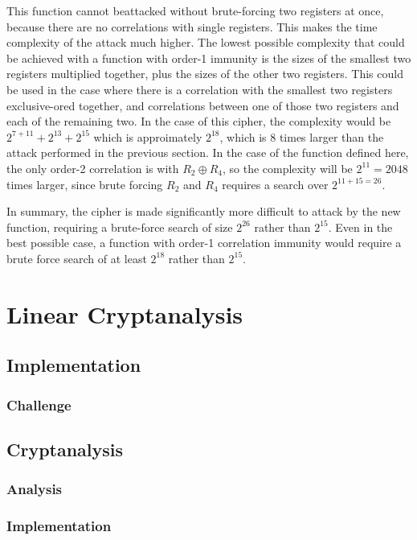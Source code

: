 \documentclass[british,11pt,a4paper]{article}
\begin{document}
This function cannot beattacked without brute-forcing two registers at once,
because there are no correlations with single registers. This makes the time
complexity of the attack much higher. The lowest possible complexity that could be achieved with a function with order-1 immunity is the sizes of the smallest two registers multiplied together, plus the sizes of the other two registers. This could be used in the case where there is a correlation with the smallest two registers exclusive-ored together, and correlations between one of those two registers and each of the remaining two. In the case of this cipher, the complexity would be \(2^{7+11} + 2^{13} + 2^{15}\) which is approimately \(2^{18}\), which is 8 times larger than the attack performed in the previous section. In the case of the function defined here, the only order-2 correlation is with \(R_2 \oplus R_4\), so the complexity will be \(2^{11} = 2048\) times larger, since brute forcing \(R_2\) and \(R_4\) requires a search over \(2^{11 + 15 = 26}\).

In summary, the cipher is made significantly more difficult to attack by the new function, requiring a brute-force search of size \(2^{26}\) rather than \(2^{15}\). Even in the best possible case, a function with order-1 correlation immunity would require a brute force search of at least \(2^{18}\) rather than \(2^{15}\).

\clearpage
\section{Linear Cryptanalysis}
\subsection{Implementation}

\subsubsection{Challenge}

\subsection{Cryptanalysis}
\subsubsection{Analysis}

\subsubsection{Implementation}
\end{document}
